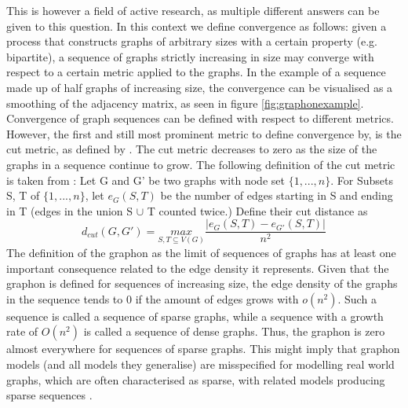 \documentclass[11pt]{report} %
\begin{document}
This is however a field of active research, as multiple different answers can be given to this question. 
In this context we define convergence as follows: given a process that constructs graphs of arbitrary sizes with a certain property (e.g. bipartite), a sequence of graphs strictly increasing in size may converge with respect to a certain metric applied to the graphs.
In the example of a sequence made up of half graphs of increasing size, the convergence can be visualised as a smoothing of the adjacency matrix, as seen in figure \ref{fig:graphonexample}.
Convergence of graph sequences can be defined with respect to different metrics.
However, the first and still most prominent metric to define convergence by, is the cut metric, as defined by . 
The cut metric decreases to zero as the size of the graphs in a sequence continue to grow.
The following definition of the cut metric is taken from :
Let G and G' be two graphs with node set $\{1, ..., n\}$. 
For Subsets S, T of $\{1, ..., n\}$, let $e_G(S,T)$ be the number of edges starting in S and ending in T (edges in the union S $\cup$ T counted twice.) Define their cut distance as
$$d_{cut}(G,G')=\underset{S,T \subseteq V(G)}{max}\dfrac{|e_G(S,T) - e_{G'}(S,T)|}{n^2}$$
The definition of the graphon as the limit of sequences of graphs has at least one important consequence related to the edge density it represents. 
Given that the graphon is defined for sequences of increasing size, the edge density of the graphs in the sequence tends to 0 if the amount of edges grows with $o(n^2)$.
Such a sequence is called a sequence of sparse graphs, while a sequence with a growth rate of $O(n^2)$ is called a sequence of dense graphs.
Thus, the graphon is zero almost everywhere for sequences of sparse graphs.
This might imply that graphon models (and all models they generalise) are misspecified for modelling real world graphs, which are often characterised as sparse, with related models producing sparse sequences \cite{wolfe2013}.\\\\
\end{document}

